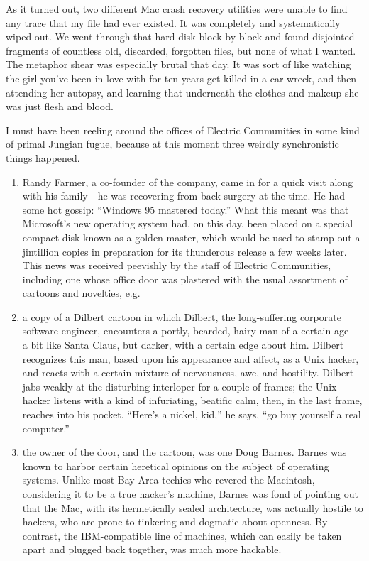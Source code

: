 \documentclass[
  fontsize=11pt,
  paper=landscape,
  twocolumn=true,
  pagesize=pdftex,
  headings=small,
  DIV=15,
  ]{scrartcl}
\begin{document}
As it turned out, two different Mac crash recovery utilities were unable
to find any trace that my file had ever existed. It was completely and
systematically wiped out. We went through that hard disk block by block
and found disjointed fragments of countless old, discarded, forgotten
files, but none of what I wanted. The metaphor shear was especially
brutal that day. It was sort of like watching the girl you've been in
love with for ten years get killed in a car wreck, and then attending
her autopsy, and learning that underneath the clothes and makeup she was
just flesh and blood.

I must have been reeling around the offices of Electric Communities in
some kind of primal Jungian fugue, because at this moment three weirdly
synchronistic things happened.

\begin{enumerate}[1.]
\item
  Randy Farmer, a co-founder of the company, came in for a quick visit
  along with his family---he was recovering from back surgery at the
  time. He had some hot gossip: ``Windows 95 mastered today.'' What this
  meant was that Microsoft's new operating system had, on this day, been
  placed on a special compact disk known as a golden master, which would
  be used to stamp out a jintillion copies in preparation for its
  thunderous release a few weeks later. This news was received peevishly
  by the staff of Electric Communities, including one whose office door
  was plastered with the usual assortment of cartoons and novelties,
  e.g.
\item
  a copy of a Dilbert cartoon in which Dilbert, the long-suffering
  corporate software engineer, encounters a portly, bearded, hairy man
  of a certain age---a bit like Santa Claus, but darker, with a certain
  edge about him. Dilbert recognizes this man, based upon his appearance
  and affect, as a Unix hacker, and reacts with a certain mixture of
  nervousness, awe, and hostility. Dilbert jabs weakly at the disturbing
  interloper for a couple of frames; the Unix hacker listens with a kind
  of infuriating, beatific calm, then, in the last frame, reaches into
  his pocket. ``Here's a nickel, kid,'' he says, ``go buy yourself a
  real computer.''
\item
  the owner of the door, and the cartoon, was one Doug Barnes. Barnes
  was known to harbor certain heretical opinions on the subject of
  operating systems. Unlike most Bay Area techies who revered the
  Macintosh, considering it to be a true hacker's machine, Barnes was
  fond of pointing out that the Mac, with its hermetically sealed
  architecture, was actually hostile to hackers, who are prone to
  tinkering and dogmatic about openness. By contrast, the IBM-compatible
  line of machines, which can easily be taken apart and plugged back
  together, was much more hackable.
\end{enumerate}
\end{document}

